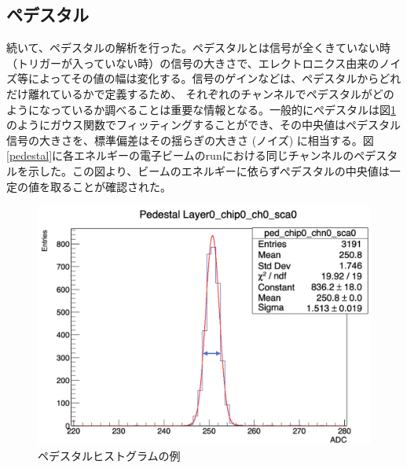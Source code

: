 \subsection{ペデスタル}
続いて、ペデスタルの解析を行った。ペデスタルとは信号が全くきていない時（トリガーが入っていない時）の信号の大きさで、エレクトロニクス由来のノイズ等によってその値の幅は変化する。信号のゲインなどは、ペデスタルからどれだけ離れているかで定義するため、 それぞれのチャンネルでペデスタルがどのようになっているか調べることは重要な情報となる。一般的にぺデスタルは図\ref{ped}のようにガウス関数でフィッティングすることができ、その中央値はペデスタル信号の大きさを、標準偏差はその揺らぎの大きさ (ノイズ) に相当する。図\ref{pedestal}に各エネルギーの電子ビームのrunにおける同じチャンネルのペデスタルを示した。この図より、ビームのエネルギーに依らずぺデスタルの中央値は一定の値を取ることが確認された。\\
\begin{figure}[H]
\begin{center}
 \includegraphics[keepaspectratio, scale=0.3]
 	{Figure/Beamtest/ped.png}
 		\caption{ペデスタルヒストグラムの例}
		\label{ped}
\end{center}
\end{figure}
